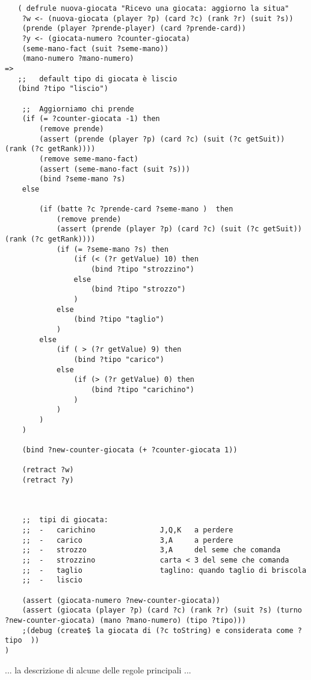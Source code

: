 \documentclass[runningheads,a4paper]{llncs}
\begin{document}
\begin{verbatim}
   ( defrule nuova-giocata "Ricevo una giocata: aggiorno la situa"
    ?w <- (nuova-giocata (player ?p) (card ?c) (rank ?r) (suit ?s))
    (prende (player ?prende-player) (card ?prende-card))
    ?y <- (giocata-numero ?counter-giocata)
    (seme-mano-fact (suit ?seme-mano))
    (mano-numero ?mano-numero)
=>
   ;;   default tipo di giocata è liscio
   (bind ?tipo "liscio") 

    ;;  Aggiorniamo chi prende
    (if (= ?counter-giocata -1) then
        (remove prende)
        (assert (prende (player ?p) (card ?c) (suit (?c getSuit)) (rank (?c getRank))))
        (remove seme-mano-fact)
        (assert (seme-mano-fact (suit ?s)))
        (bind ?seme-mano ?s)
    else

        (if (batte ?c ?prende-card ?seme-mano )  then
            (remove prende)
            (assert (prende (player ?p) (card ?c) (suit (?c getSuit)) (rank (?c getRank))))
            (if (= ?seme-mano ?s) then
                (if (< (?r getValue) 10) then
                    (bind ?tipo "strozzino")
                else
                    (bind ?tipo "strozzo")
                )
            else
                (bind ?tipo "taglio")
            )
        else
            (if ( > (?r getValue) 9) then
                (bind ?tipo "carico")
            else
                (if (> (?r getValue) 0) then
                    (bind ?tipo "carichino")
                )
            )
        )
    )

    (bind ?new-counter-giocata (+ ?counter-giocata 1))

    (retract ?w)
    (retract ?y)



    ;;  tipi di giocata:
    ;;  -   carichino               J,Q,K   a perdere
    ;;  -   carico                  3,A     a perdere
    ;;  -   strozzo                 3,A     del seme che comanda
    ;;  -   strozzino               carta < 3 del seme che comanda
    ;;  -   taglio                  taglino: quando taglio di briscola
    ;;  -   liscio

    (assert (giocata-numero ?new-counter-giocata))
    (assert (giocata (player ?p) (card ?c) (rank ?r) (suit ?s) (turno ?new-counter-giocata) (mano ?mano-numero) (tipo ?tipo)))
    ;(debug (create$ la giocata di (?c toString) e considerata come ?tipo  ))
)

\end{verbatim}


... la descrizione di alcune delle regole principali ...
\end{document}
